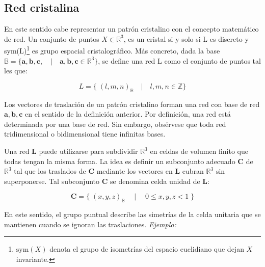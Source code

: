 \documentclass{report}
\begin{document}
\subsection{Red cristalina}




En este sentido cabe representar un patrón cristalino con el concepto matemático de red. Un conjunto de puntos $X\in \mathbb{R}^3$, es un cristal si  y solo si L es discreto y sym(L)\footnote{$\mathrm{sym}(X)$ denota el grupo de isometrías del espacio euclidiano que dejan $X$ invariante.} es grupo espacial cristalográfico. Más concreto, dada la base $\mathbb{B}=\{\textbf{a},\textbf{b},\textbf{c},\quad \vert \quad \textbf{a},\textbf{b},\textbf{c}\in \mathbb{R}^3 \} $, se define una red L como el conjunto de puntos tal les que:


\vspace{.1cm}
\[L=\{\;(l,m,n)_\mathbb{B}\quad \vert  \quad l,m,n \in \mathbb{Z} \}\]

\vspace{.1cm}


Los vectores de traslación de un patrón cristalino forman una red con base de red $\mathbf{a}, \mathbf{b}, \mathbf{c}$ en el sentido de la definición anterior. Por definición, una red está determinada por una base de red. Sin embargo, obsérvese que toda red  tridimensional o bidimensional  tiene infinitas bases.\\
\vspace{.2cm}


Una red \( \mathbf{L} \) puede utilizarse para subdividir \( \mathbb{R}^3 \) en celdas de volumen finito que todas tengan la misma forma. La idea es definir un subconjunto adecuado \( \mathbf{C} \) de \( \mathbb{R}^3 \) tal que los traslados de \( \mathbf{C} \) mediante los vectores en \( \mathbf{L} \) cubran \( \mathbb{R}^3 \) sin superponerse. Tal subconjunto \( \mathbf{C} \) se denomina celda unidad de \( \mathbf{L} \):



    \[
    \mathbf{C} = \{\; (x,y,z)_\mathbb{B} \quad  \mid \quad  0 \leq x, y, z < 1 \; \}
    \]


En este sentido, el grupo puntual  describe las simetrías de la celda unitaria que se mantienen cuando se ignoran las traslaciones.
\newpage
\textit{Ejemplo:}
\end{document}
